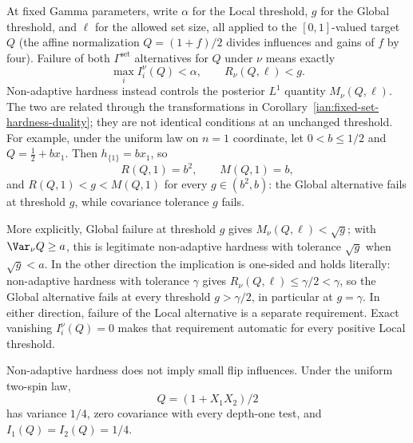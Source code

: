 \begin{remark}
\label{ian:nonadaptive-hardness-versus-gamma-failure}
At fixed Gamma parameters, write \(\alpha\) for the Local threshold,
\(g\) for the Global threshold, and \(\ell\) for the allowed set size,
all applied to the \([0,1]\)-valued target \(Q\) (the affine
normalization \(Q=(1+f)/2\) divides influences and gains of \(f\) by
four). Failure of both \(\Gamma^{\mathrm{set}}\) alternatives for \(Q\)
under \(\nu\) means exactly
\[
 \max_i I_i^\nu(Q)<\alpha,
 \qquad
 R_\nu(Q,\ell)<g.
\]
Non-adaptive hardness instead controls the posterior \(L^1\) quantity
\(M_\nu(Q,\ell)\). The two are related through the transformations in
Corollary~\ref{ian:fixed-set-hardness-duality}; they are not identical
conditions at an unchanged threshold. For example, under the uniform
law on \(n=1\) coordinate, let \(0<b\le1/2\) and
\(Q=\frac12+bx_1\). Then \(h_{\{1\}}=bx_1\), so
\[
 R(Q,1)=b^2,\qquad M(Q,1)=b,
\]
and \(R(Q,1)<g<M(Q,1)\) for every \(g\in(b^2,b)\): the Global
alternative fails at threshold \(g\), while covariance tolerance \(g\)
fails.

More explicitly, Global failure at threshold \(g\) gives
\(M_\nu(Q,\ell)<\sqrt g\); with \(\Var_\nu Q\ge a\), this is legitimate
non-adaptive hardness with tolerance \(\sqrt g\) when \(\sqrt g<a\).
In the other direction the implication is one-sided and holds
literally: non-adaptive hardness with tolerance \(\gamma\) gives
\(R_\nu(Q,\ell)\le\gamma/2<\gamma\), so the Global alternative fails at
every threshold \(g>\gamma/2\), in particular at \(g=\gamma\).
In either direction, failure of the Local alternative is a separate
requirement. Exact vanishing \(I_i^\nu(Q)=0\) makes that requirement
automatic for every positive Local threshold.

Non-adaptive hardness does not imply small flip influences. Under
the uniform two-spin law,
\[
 Q=(1+X_1X_2)/2
\]
has variance \(1/4\), zero covariance with every depth-one test, and
\(I_1(Q)=I_2(Q)=1/4\).
\end{remark}

